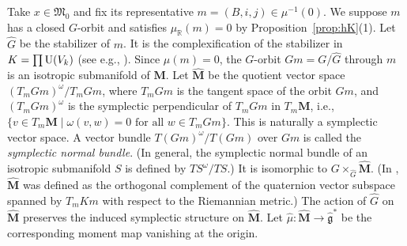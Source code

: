 \documentclass[12pt]{amsart}
\def\Bbb{\mathbb}
\def\frak{\mathfrak}
\theoremstyle{definition}
\theoremstyle{remark}
\numberwithin{equation}{subsection}
\newcommand{\propref}[1]{Proposition~\ref{#1}}
\newcommand{\R}{{\Bbb R}}
\newcommand{\U}{\operatorname{\rm U}}
\newcommand{\bM}{{\mathbf M}} %
\newcommand{\M}{{\frak M}} %
\begin{document}
Take $x\in\M_0$ and fix its representative $m =
(B,i,j)\in\mu^{-1}(0)$. We suppose $m$ has a closed $G$-orbit and
satisfies $\mu_\R(m) = 0$ by \propref{prop:hK}(1).
%
Let $\widehat G$ be the stabilizer of $m$. It is the complexification
of the stabilizer in $K = \prod \U(V_k)$ (see e.g., \cite[1.6]{Sj}).
%
Since $\mu(m) = 0$, the $G$-orbit $Gm = G/\widehat G$ through $m$ is
an isotropic submanifold of $\bM$.
%
Let $\widehat\bM$ be the quotient vector space
$(T_m Gm)^\omega/T_m Gm$, where 
$T_m Gm$ is the tangent space of the orbit $Gm$, and $(T_m Gm)^\omega$ 
is the symplectic perpendicular of $T_m Gm$ in $T_m\bM$, i.e.,
\(
   \{ v\in T_m\bM \mid
   \text{$\omega(v,w) = 0$ for all $w\in T_m Gm$}\}
\).
This is naturally a symplectic vector space.
A vector bundle $T(Gm)^\omega/T(Gm)$ over $Gm$ is called the {\it
symplectic normal bundle}.
%
(In general, the symplectic normal bundle of an isotropic submanifold
$S$ is defined by $TS^\omega/TS$.)
%
It is isomorphic to $G\times_{\widehat G}\widehat\bM$.
%
(In \cite[p.388]{Na-quiver}, $\widehat\bM$ was defined as the
orthogonal complement of the quaternion vector subspace spanned by
$T_m Km$ with respect to the Riemannian metric.)
%
The action of $\widehat G$ on $\widehat\bM$ preserves the induced
symplectic structure on $\widehat\bM$. Let $\widehat\mu\colon
\widehat\bM\to \widehat{\mathfrak g}^*$ be the corresponding moment
map vanishing at the origin.
\end{document}
